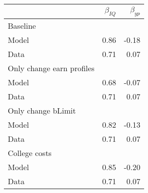 \begin{tabular}{lrr}
\hline
  & $\beta_{IQ}$  & $\beta_{yp}$  \\
\hline
Baseline &   &   \\
Model & 0.86  & -0.18  \\
Data & 0.71  & 0.07  \\
Only change earn profiles &   &   \\
Model & 0.68  & -0.07  \\
Data & 0.71  & 0.07  \\
Only change bLimit &   &   \\
Model & 0.82  & -0.13  \\
Data & 0.71  & 0.07  \\
College costs &   &   \\
Model & 0.85  & -0.20  \\
Data & 0.71  & 0.07  \\
\hline
\end{tabular}%
